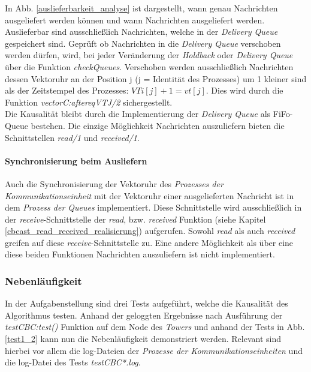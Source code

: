 In Abb. \ref{auslieferbarkeit_analyse} ist dargestellt, wann genau Nachrichten ausgeliefert werden können und wann Nachrichten ausgeliefert werden.\\
Auslieferbar sind ausschließlich Nachrichten, welche in der \textit{Delivery Queue} gespeichert sind. Geprüft ob Nachrichten in die \textit{Delivery Queue} verschoben werden dürfen, wird, bei jeder Veränderung der \textit{Holdback} oder \textit{Delivery Queue} über die Funktion \textit{checkQueues}. Verschoben werden ausschließlich Nachrichten dessen Vektoruhr an der Position j (j = Identität des Prozesses) um 1 kleiner sind als der Zeitstempel des Prozesses: $VTi[j]+1 = vt[j]$. Dies wird durch die Funktion \textit{vectorC:aftereqVTJ/2} sichergestellt.\\
Die Kausalität bleibt durch die Implementierung der \textit{Delivery Queue} als FiFo-Queue bestehen. Die einzige Möglichkeit Nachrichten auszuliefern bieten die Schnittstellen \textit{read/1} und \textit{received/1}.

\paragraph{Synchronisierung beim Ausliefern}

Auch die Synchronisierung der Vektoruhr des \textit{Prozesses der Kommunikationseinheit} mit der Vektoruhr einer ausgelieferten Nachricht ist in dem \textit{Prozess der Queues} implementiert. Diese Schnittstelle wird ausschließlich in der \textit{receive}-Schnittstelle der \textit{read}, bzw. \textit{received} Funktion (siehe Kapitel \ref{cbcast_read_received_realisierung}) aufgerufen. Sowohl \textit{read} als auch \textit{received} greifen auf diese \textit{receive}-Schnittstelle zu. Eine andere Möglichkeit als über eine diese beiden Funktionen Nachrichten auszuliefern ist nicht implementiert.

\subsubsection{Nebenläufigkeit}

In der Aufgabenstellung sind drei Tests aufgeführt, welche die Kausalität des Algorithmus testen. Anhand der geloggten Ergebnisse nach Ausführung der \textit{testCBC:test()} Funktion auf dem Node des \textit{Towers} und anhand der Tests in Abb. \ref{test1_2} kann nun die Nebenläufigkeit demonstriert werden. Relevant sind hierbei vor allem die log-Dateien der \textit{Prozesse der Kommunikationseinheiten} und die log-Datei des Tests \textit{testCBC*.log}. 

